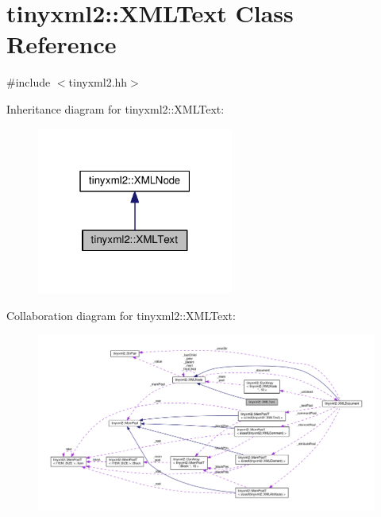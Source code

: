 \hypertarget{classtinyxml2_1_1XMLText}{}\section{tinyxml2\+:\+:X\+M\+L\+Text Class Reference}
\label{classtinyxml2_1_1XMLText}


{\ttfamily \#include $<$tinyxml2.\+hh$>$}



Inheritance diagram for tinyxml2\+:\+:X\+M\+L\+Text\+:
\nopagebreak
\begin{figure}[H]
\begin{center}
\leavevmode
\includegraphics[width=183pt]{classtinyxml2_1_1XMLText__inherit__graph}
\end{center}
\end{figure}


Collaboration diagram for tinyxml2\+:\+:X\+M\+L\+Text\+:
\nopagebreak
\begin{figure}[H]
\begin{center}
\leavevmode
\includegraphics[width=350pt]{classtinyxml2_1_1XMLText__coll__graph}
\end{center}
\end{figure}
